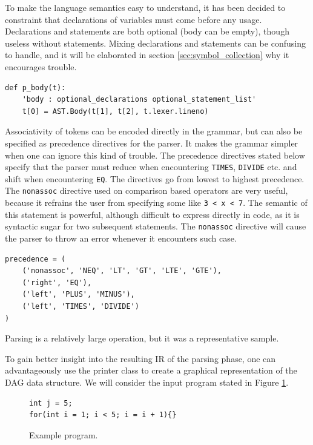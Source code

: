 To make the language semantics easy to understand, it has been decided to constraint that declarations of variables must come before any usage. Declarations and statements are both optional (body can be empty), though useless without statements. Mixing declarations and statements can be confusing to handle, and it will be elaborated in section \ref{sec:symbol_collection} why it encourages trouble.

\begin{verbatim}
def p_body(t):
    'body : optional_declarations optional_statement_list'
    t[0] = AST.Body(t[1], t[2], t.lexer.lineno)
\end{verbatim}

Associativity of tokens can be encoded directly in the grammar, but can also be specified as precedence directives for the parser. It makes the grammar simpler when one can ignore this kind of trouble. The precedence directives stated below specify that the parser must reduce when encountering \texttt{TIMES}, \texttt{DIVIDE} etc. and shift when encountering \texttt{EQ}. The directives go from lowest to highest precedence. The \texttt{nonassoc} directive used on comparison based operators are very useful, because it refrains the user from specifying some like \texttt{3 < x < 7}. The semantic of this statement is powerful, although difficult to express directly in code, as it is syntactic sugar for two subsequent statements. The \texttt{nonassoc} directive will cause the parser to throw an error whenever it encounters such case. 

\begin{verbatim}
precedence = (
    ('nonassoc', 'NEQ', 'LT', 'GT', 'LTE', 'GTE'),
    ('right', 'EQ'),
    ('left', 'PLUS', 'MINUS'),
    ('left', 'TIMES', 'DIVIDE')
)
\end{verbatim}

Parsing is a relatively large operation, but it was a representative sample.

To gain better insight into the resulting IR of the parsing phase, one can advantageously use the printer class to create a graphical representation of the DAG data structure. We will consider the input program stated in Figure \ref{fig:ex_program}.

\begin{figure}[H]
\begin{verbatim}
int j = 5; 
for(int i = 1; i < 5; i = i + 1){}   
\end{verbatim}
    \caption{Example program.}
    \label{fig:ex_program}
\end{figure}

